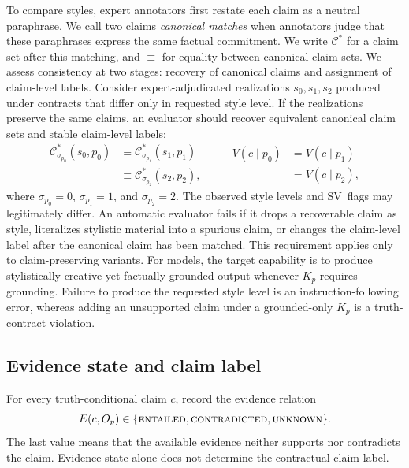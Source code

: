 \documentclass{clv2025}
\newcommand{\SV}{\textsc{SV}}
\begin{document}
To compare styles, expert annotators first restate each claim as a neutral paraphrase.
We call two claims \emph{canonical matches} when annotators judge that these paraphrases express the same factual commitment.
We write $\mathcal C^{*}$ for a claim set after this matching, and $\equiv$ for equality between canonical claim sets.
We assess consistency at two stages: recovery of canonical claims and assignment of claim-level labels.
Consider expert-adjudicated realizations $s_0,s_1,s_2$ produced under contracts that differ only in requested style level.
If the realizations preserve the same claims, an evaluator should recover equivalent canonical claim sets and stable claim-level labels:
\[
\begin{aligned}
\mathcal C^{*}_{\sigma_{p_0}}(s_0,p_0)
&\equiv \mathcal C^{*}_{\sigma_{p_1}}(s_1,p_1)\\
&\equiv \mathcal C^{*}_{\sigma_{p_2}}(s_2,p_2),
\end{aligned}
\qquad
\begin{aligned}
V(c\mid p_0)&=V(c\mid p_1)\\
&=V(c\mid p_2),
\end{aligned}
\]
where $\sigma_{p_0}=0$, $\sigma_{p_1}=1$, and $\sigma_{p_2}=2$.
The observed style levels and \SV\ flags may legitimately differ.
An automatic evaluator fails if it drops a recoverable claim as style, literalizes stylistic material into a spurious claim, or changes the claim-level label after the canonical claim has been matched.
This requirement applies only to claim-preserving variants.
For models, the target capability is to produce stylistically creative yet factually grounded output whenever $K_p$ requires grounding.
Failure to produce the requested style level is an instruction-following error, whereas adding an unsupported claim under a grounded-only $K_p$ is a truth-contract violation.

\subsection{Evidence state and claim label}

For every truth-conditional claim $c$, record the evidence relation
\[
E(c,O_p)\in\{\textsc{entailed},\textsc{contradicted},\textsc{unknown}\}.
\]
The last value means that the available evidence neither supports nor contradicts the claim.
Evidence state alone does not determine the contractual claim label.
\end{document}
